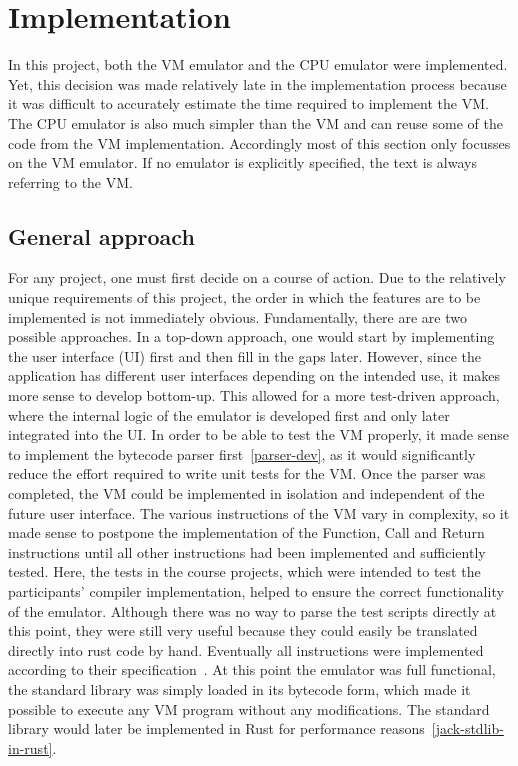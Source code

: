 \section{Implementation} \label{implementation}
In this project, both the VM emulator and the CPU emulator were implemented. Yet, this decision was made relatively late in the implementation process because it was difficult to accurately estimate the time required to implement the VM.
The CPU emulator is also much simpler than the VM and can reuse some of the code from the VM implementation.
Accordingly most of this section only focusses on the VM emulator. If no emulator is explicitly specified, the text is always referring to the VM.

\subsection{General approach}
For any project, one must first decide on a course of action. Due to the relatively unique requirements of this project, the order in which the features are to be implemented is not immediately obvious.
Fundamentally, there are are two possible approaches. In a top-down approach, one would start by implementing the user interface (UI) first and then fill in the gaps later.
However, since the application has different user interfaces depending on the intended use, it makes more sense to develop bottom-up.
This allowed for a more test-driven approach, where the internal logic of the emulator is developed first and only later integrated into the UI.
In order to be able to test the VM properly, it made sense to implement the bytecode parser first~\ref{parser-dev}, as it would significantly reduce the effort required to write unit tests for the VM.
Once the parser was completed, the VM could be implemented in isolation and independent of the future user interface. The various instructions of the VM vary in complexity, so it made sense to postpone the implementation of the Function, Call and Return instructions until all other instructions had been implemented and sufficiently tested.
Here, the tests in the course projects, which were intended to test the participants' compiler implementation, helped to ensure the correct functionality of the emulator.
Although there was no way to parse the test scripts directly at this point, they were still very useful because they could easily be translated directly into rust code by hand.
Eventually all instructions were implemented according to their specification~\cite{nisan2005}.
At this point the emulator was full functional, the standard library was simply loaded in its bytecode form, which made it possible to execute any VM program without any modifications. The standard library would later be implemented in Rust for performance reasons~\ref{jack-stdlib-in-rust}.

